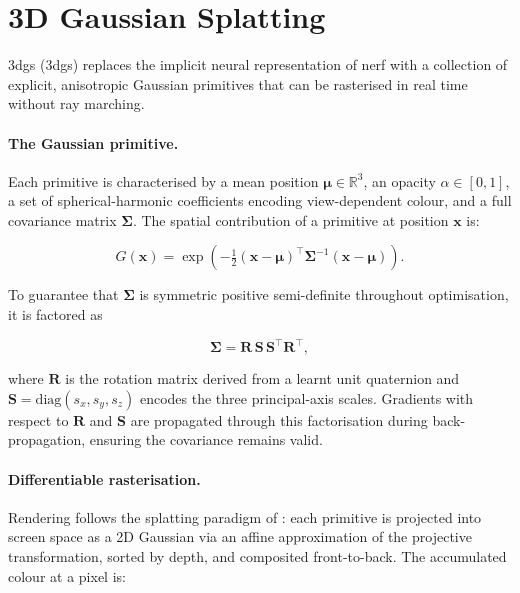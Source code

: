 \section{3D Gaussian Splatting}\label{sec:3dgs}

\acrlong{3dgs} (\acrshort{3dgs}) \parencite{Kerbl2023} replaces the implicit neural
representation of \acrshort{nerf} with a collection of explicit, anisotropic
Gaussian primitives that can be rasterised in real time without ray marching.

\paragraph{The Gaussian primitive.}
Each primitive is characterised by a mean position $\boldsymbol{\mu} \in \mathbb{R}^3$,
an opacity $\alpha \in [0,1]$, a set of spherical-harmonic coefficients encoding
view-dependent colour, and a full covariance matrix $\boldsymbol{\Sigma}$. The
spatial contribution of a primitive at position $\mathbf{x}$ is:

\begin{equation}
  G(\mathbf{x}) = \exp\!\left(-\tfrac{1}{2}(\mathbf{x} - \boldsymbol{\mu})^\top
  \boldsymbol{\Sigma}^{-1}(\mathbf{x} - \boldsymbol{\mu})\right).
  \label{eq:gaussian}
\end{equation}

To guarantee that $\boldsymbol{\Sigma}$ is symmetric positive semi-definite throughout
optimisation, it is factored as

\begin{equation}
  \boldsymbol{\Sigma} = \mathbf{R}\,\mathbf{S}\,\mathbf{S}^\top\mathbf{R}^\top,
  \label{eq:covariance}
\end{equation}

where $\mathbf{R}$ is the rotation matrix derived from a learnt unit quaternion and
$\mathbf{S} = \mathrm{diag}(s_x, s_y, s_z)$ encodes the three principal-axis
scales. Gradients with respect to $\mathbf{R}$ and $\mathbf{S}$ are propagated
through this factorisation during back-propagation, ensuring the covariance
remains valid.

\paragraph{Differentiable rasterisation.}
Rendering follows the splatting paradigm of \textcite{Zwicker2001}: each primitive
is projected into screen space as a 2D Gaussian via an affine approximation of
the projective transformation, sorted by depth, and composited front-to-back.
The accumulated colour at a pixel is:

